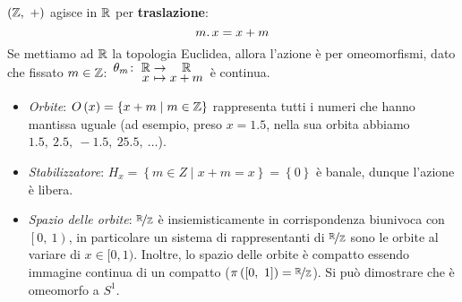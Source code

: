 \begin{example}
	$\left(\mathbb{Z},\ +\right)$ agisce in $\mathbb{R}$ per \textbf{traslazione}:
	\begin{equation}
		m\ldotp x = x+m
	\end{equation}
Se mettiamo ad $\mathbb{R}$ la topologia Euclidea, allora l'azione è per omeomorfismi, dato che fissato $m\in \mathbb{Z}$: $\funztot{\theta_m}{\realset}{\realset}{x}{x+m}$ è continua.
\begin{itemize}
	\item \textit{Orbite}: $O\left(x\right)=\left\{x+m\mid m\in \mathbb{Z}\right\}$ rappresenta tutti i numeri che hanno mantissa uguale (ad esempio, preso $x=1.5$, nella sua orbita abbiamo $1.5,\ 2.5,\ -1.5,\ 25.5,\ \ldots$).
	\item \textit{Stabilizzatore}: $H_x=\left\{m\in Z\mid x+m=x\right\}=\left\{0\right\}$ è banale, dunque l'azione è libera.
	\item \textit{Spazio delle orbite}: $\nicefrac{\mathbb{R}}{\mathbb{Z}}$ è insiemisticamente in corrispondenza biunivoca con $\left[0,\ 1\right)$, in particolare un sistema di rappresentanti di $\nicefrac{\mathbb{R}}{\mathbb{Z}}$ sono le orbite al variare di $x\in[0,1)$. Inoltre, lo spazio delle orbite è compatto essendo immagine continua di un compatto ($\pi\left(\left[0,\ 1\right]\right)=\nicefrac{\realset}{\integerset}$). Si può dimostrare che è omeomorfo a $S^1$.
\end{itemize}
\end{example}
